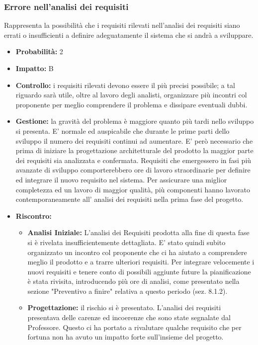 \documentclass[a4paper,11pt]{article}
\begin{document}
		\subsubsection{Errore nell'analisi dei requisiti}
		Rappresenta la possibilità che i requisiti rilevati nell'analisi dei requisiti siano errati o insufficienti a definire adeguatamente il sistema che si andrà a sviluppare.
		\begin{itemize}
		\item \textbf{Probabilità:} 2
		\item \textbf{Impatto:} B
		\item \textbf{Controllo:} i requisiti rilevati devono essere il più precisi possibile; a tal riguardo sarà utile, oltre al lavoro degli analisti, organizzare più incontri col proponente per meglio comprendere il problema e dissipare eventuali dubbi.
		\item \textbf{Gestione:} la gravità del problema è maggiore quanto più tardi nello sviluppo si presenta. E' normale ed auspicabile che durante le prime parti dello sviluppo il numero dei requisiti continui ad aumentare. E' però necessario che prima di iniziare la progettazione architetturale del prodotto la maggior parte dei requisiti sia analizzata e confermata. Requisiti che emergessero in fasi più avanzate di sviluppo comporterebbero ore di lavoro straordinarie per definire ed integrare il nuovo requisito nel sistema. Per assicurare una miglior completezza ed un lavoro di maggior qualità, più componenti hanno lavorato contemporaneamente all' analisi dei requisiti nella prima fase del progetto.
		\item \textbf{Riscontro:}
			\begin{itemize}
				\item\textbf{Analisi Iniziale:} L'analisi dei Requisiti prodotta alla fine di questa fase si è rivelata insufficientemente dettagliata. E' stato quindi subito organizzato un incontro col proponente che ci ha aiutato a comprendere meglio il prodotto e a trarre ulteriori requisiti. Per integrare velocemente i nuovi requisiti e tenere conto di possibili aggiunte future la pianificazione è stata rivisita, introducendo più ore di analisi, come presentato nella sezione "Preventivo a finire" relativa a questo periodo (sez. 8.1.2).
				\item\textbf{Progettazione:} il rischio si è presentato. L'analisi dei requisiti presentava delle carenze ed incoerenze che sono state segnalate dal Professore. Questo ci ha portato a rivalutare qualche requisito che per fortuna non ha avuto un impatto forte sull'insieme del progetto.
			\end{itemize}
		\end{itemize}
\end{document}
